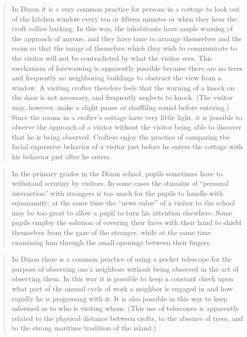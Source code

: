 \documentclass[openany,nobib]{tufte-book}
\begin{document}
\begin{quote}
In Dixon it is a very common practice for persons in a cottage to look
out of the kitchen window every ten or fifteen minutes or when they hear
the croft collies barking. In this way, the inhabitants have ample
warning of the approach of anyone, and they have time to arrange
themselves and the room so that the image of thenselves which they wish
to communicate to the visitor will not be contradicted by what the
visitor sees. This mechanism of forewarning is apparently possible
because there are no trees and frequently no neighboring buildings to
obstruct the view from a window. A visiting crofter therefore feels that
the warning of a knock on the door is not necessary, and frequently
neglects to knock. (The visitor may, however, make a slight pause or
shufflilng sound before entering.) Since the rooms in a crofter's
cottage have very little light, it is possible to observe the approach
of a visitor without the visitor being able to discover that he is being
observed. Crofters enjoy the practice of comparing tbe facial expressive
behavior of a visitor just before he enters the cottage with his
behavior just after he enters.
\end{quote}

\begin{quote}
In the primary grades in the Dixon school, pupils some­times have to
withstand scrutiny by visitors. In some cases the stimulus of ``personal
interaction'' with strangers is too much for the pupils to handle with
equanamity; at the same time the ``news value'' of a visitor to the
school may be too great to allow a pupil to turn his attention
elsewhere. Some pupils em­ploy the solution of covering their faces with
their hand to shield themselves from the gaze of the stranger, while at
the same time examining him through the small openings between their
fingers.
\end{quote}

\begin{quote}
In Dixon there is a common practice of using a pocket telescope for the
purpose of observing one's neighbors without being observed in the act
of observing them. In this way it is possible to keep a constant check
upon what part of the annual cycle of work a neighbor is engaged in and
how rapidly he is progressing with it. It is also possible in this way
to keep informed as to who is visiting whom. (This use of telescopes is
apparently related to the physical distance between crofts, to the
absence of trees, and to the strong maritime tradition of the island.)
\end{quote}
\end{document}
